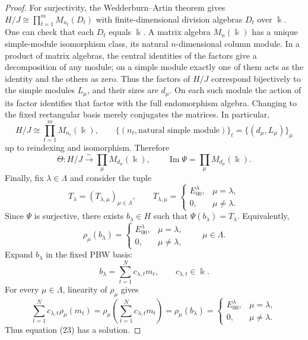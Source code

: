 \documentclass[10pt,oneside]{amsart}
\newcommand{\kk}{\Bbbk}
\theoremstyle{definition}
\begin{document}
\begin{proof}
For surjectivity, the Wedderburn--Artin theorem gives
$H/J\cong\prod_{t=1}^{m}M_{n_t}(D_t)$ with finite-dimensional division
algebras $D_t$ over $\kk$. One can check that each $D_t$ equals $\kk$.
A matrix algebra $M_n(\kk)$ has a unique simple-module isomorphism
class, its natural $n$-dimensional column module. In a product of matrix
algebras, the central identities of the factors give a decomposition
of any module; on a simple module exactly one of them acts as the
identity and the others as zero. Thus the factors of $H/J$ correspond
bijectively to the simple modules $L_\mu$, and their sizes are $d_\mu$.
On each such module the action of its factor identifies that factor
with the full endomorphism algebra. Changing to the fixed rectangular
basis merely conjugates the matrices. In particular,
\[
 H/J\cong\prod_{t=1}^{m}M_{n_t}(\kk),\qquad
 \{(n_t,\text{natural simple module})\}_t
 =\{(d_\mu,L_\mu)\}_\mu
\]
up to reindexing and isomorphism. Therefore
\[
 \Theta:H/J\xrightarrow{\sim}\prod_\mu M_{d_\mu}(\kk),
 \qquad\operatorname{Im}\Psi=\prod_\mu M_{d_\mu}(\kk).
\]
Finally, fix $\lambda\in\Lambda$ and consider the tuple
\[
 T_\lambda=(T_{\lambda,\mu})_{\mu\in\Lambda},\qquad
 T_{\lambda,\mu}=
 \begin{cases}
 E_{00}^\lambda,&\mu=\lambda,\\
 0,&\mu\ne\lambda.
 \end{cases}
\]
Since $\Psi$ is surjective, there exists $b_\lambda\in H$ such that
$\Psi(b_\lambda)=T_\lambda$. Equivalently,
\[
 \rho_\mu(b_\lambda)=
 \begin{cases}
 E_{00}^\lambda,&\mu=\lambda,\\
 0,&\mu\ne\lambda,
 \end{cases}
 \qquad\mu\in\Lambda.
\]
Expand $b_\lambda$ in the fixed PBW basis:
\[
 b_\lambda=\sum_{t=1}^{N}c_{\lambda,t}m_t,
 \qquad c_{\lambda,t}\in\kk.
\]
For every $\mu\in\Lambda$, linearity of $\rho_\mu$ gives
\[
 \sum_{t=1}^{N}c_{\lambda,t}\rho_\mu(m_t)
 =\rho_\mu\!\left(\sum_{t=1}^{N}c_{\lambda,t}m_t\right)
 =\rho_\mu(b_\lambda)
 =\begin{cases}
 E_{00}^\lambda,&\mu=\lambda,\\
 0,&\mu\ne\lambda.
 \end{cases}
\]
Thus equation (23) has a solution.
\end{proof}
\end{document}
